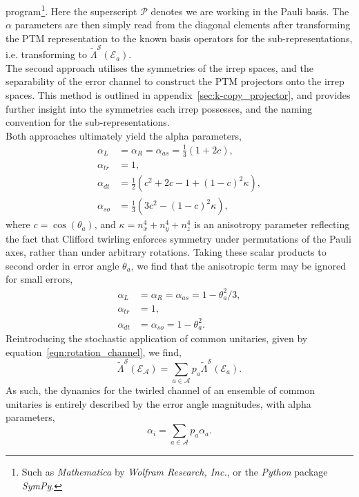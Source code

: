 program\footnote{Such as \emph{Mathematica} by \emph{Wolfram Research, Inc.}, or the \emph{Python} package \emph{SymPy}.}. Here the superscript $\mathcal{P}$ denotes we are working in the Pauli basis.
The $\alpha$ parameters are then simply read from the diagonal elements after transforming the PTM representation to the known basis operators for the sub-representations, i.e. transforming to $\tilde\Lambda^\mathcal{S}(\mathcal{E}_a)$.\\
The second approach utilises the symmetries of the irrep spaces, and the separability of the error channel to construct the PTM projectors onto the irrep spaces. This method is outlined in appendix~\ref{sec:k-copy_projector}, and provides further insight into the symmetries each irrep possesses, and the naming convention for the sub-representations.\\
Both approaches ultimately yield the alpha parameters,
\begin{align}
    \alpha_{L}&=\alpha_R=\alpha_{as}=\frac{1}{3}(1+2c),\\
    \alpha_{tr}&=1,\\
    \alpha_{dt}&=\frac{1}{2}(c^2+2c-1+(1-c)^2\kappa),\\
    \alpha_{so}&=\frac{1}{3}(3c^2-(1-c)^2\kappa),
\end{align}
where $c=\cos(\theta_a)$,  and $\kappa=n_x^4+n_y^4+n_z^4$ is an anisotropy parameter reflecting the fact that Clifford twirling enforces symmetry under permutations of the Pauli axes, rather than under arbitrary rotations.
Taking these scalar products to second order in error angle $\theta_a$,
we find that the anisotropic term may be ignored for small errors,
\begin{align}
        \alpha_L&=\alpha_R=\alpha_{as}= 1- \theta_a^2/3, \\
        \alpha_{tr} &= 1,\\
        \alpha_{dt} &= \alpha_{so} = 1- \theta_a^2. 
\end{align}
Reintroducing the stochastic application of common unitaries, given by equation~\ref{eqn:rotation_channel}, we find,
\begin{equation}
\tilde \Lambda^\mathcal{S}(\mathcal{E}_\mathcal{A})=\sum_{a\in\mathcal{A}} p_a \tilde \Lambda^\mathcal{S}(\mathcal{E}_a).
\end{equation}
As such, the dynamics for the twirled channel of an ensemble of common unitaries is entirely described by the error angle magnitudes, with alpha parameters,
\begin{equation}
\alpha_i = \sum_{a\in\mathcal{A}} p_a \alpha_a.
\end{equation}
